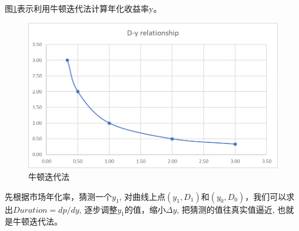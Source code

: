 图\ref{fig:sys.param}表示利用牛顿迭代法计算年化收益率y。
\begin{figure}[htbp]
\begin{center}
\includegraphics[width=16cm]{img//Newton.PNG}
\caption{牛顿迭代法}
\label{fig:sys.param}
\end{center}
\end{figure}

先根据市场年化率，猜测一个$y_1$,
对曲线上点$(y_1, D_1)$和$(y_0, D_0)$，我们可以求出$Duration = dp/dy$,
逐步调整$y_1$的值，缩小$\Delta y$,
把猜测的值往真实值逼近,
也就是牛顿迭代法。
